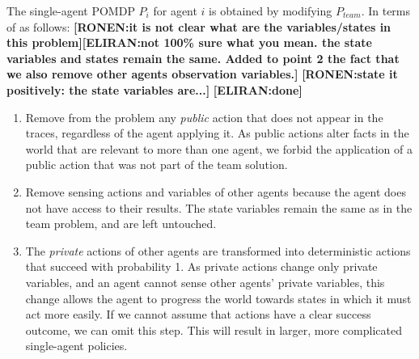 \documentclass[letterpaper]{article} %
\theoremstyle{definition}
\newcommand{\eliran}[1]{\textbf{[\color{red}ELIRAN:#1]}}
\newcommand{\ronen}[1]{\textbf{[\color{blue}RONEN:#1]}}
\begin{document}
The single-agent POMDP $P_i$ for agent $i$ is obtained by modifying $P_{team}$. In terms of
as follows:
\ronen{it is not clear what are the variables/states in this problem}\eliran{not 100\% sure what you mean. the state variables and states remain the same. Added to point 2 the fact that we also remove other agents observation variables.}
\ronen{state it positively: the state variables are...} 
\eliran{done}
\begin{enumerate}
\item Remove from the problem any \emph{public} action that does not appear in the traces, regardless of the agent applying it. As public actions alter facts in the world that are relevant to more than one agent, we  forbid the application of a public action that was not part of the team solution.
\item Remove sensing actions and variables of other agents because the agent does
not have access to their results. The state variables remain the same as in the team problem, and are left untouched.
\item The \emph{private} actions of other agents are transformed into deterministic actions that succeed with probability 1.
As private actions change only private variables, and an agent cannot sense other agents' private variables, this change allows the agent to progress the world towards states in which it must act more easily.
If we cannot assume that actions have a clear success outcome, we can omit this step. This will result in larger, more complicated single-agent policies.


\end{enumerate}
\end{document}
